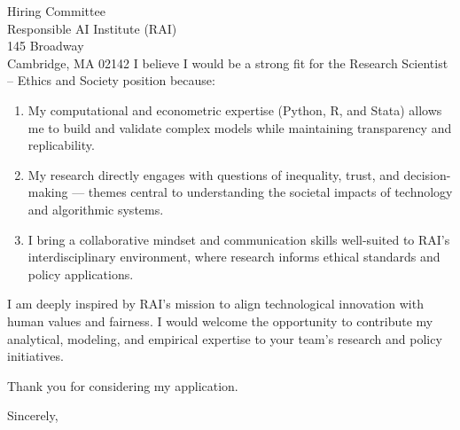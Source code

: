 \documentclass[11pt,letterpaper]{letter}
\begin{document}
\begin{letter}{Hiring Committee \\
Responsible AI Institute (RAI) \\
145 Broadway \\
Cambridge, MA 02142}
I believe I would be a strong fit for the Research Scientist – Ethics and Society position because:
\begin{enumerate}
    \item My computational and econometric expertise (Python, R, and Stata) allows me to build and validate complex models while maintaining transparency and replicability.
    \item My research directly engages with questions of inequality, trust, and decision-making — themes central to understanding the societal impacts of technology and algorithmic systems.
    \item I bring a collaborative mindset and communication skills well-suited to RAI’s interdisciplinary environment, where research informs ethical standards and policy applications.
\end{enumerate}

I am deeply inspired by RAI’s mission to align technological innovation with human values and fairness. I would welcome the opportunity to contribute my analytical, modeling, and empirical expertise to your team’s research and policy initiatives.

Thank you for considering my application.

\closing{Sincerely,}

\end{letter}
\end{document}
